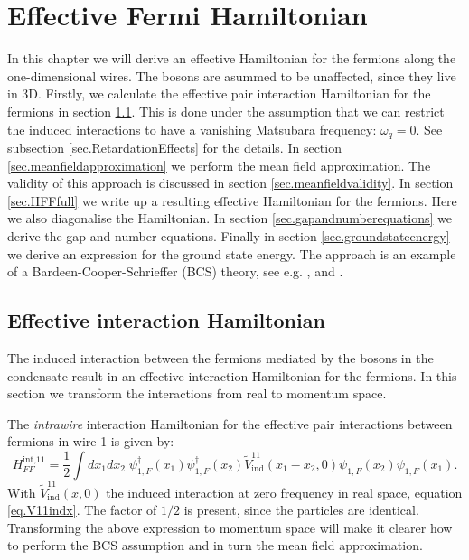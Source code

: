 
\chapter{Effective Fermi Hamiltonian} %

\label{Chapter4} %


In this chapter we will derive an effective Hamiltonian for the fermions along the one-dimensional wires. The bosons are asummed to be unaffected, since they live in 3D. Firstly, we calculate the effective pair interaction Hamiltonian for the fermions in section \ref{sec.HFFint}. This is done under the assumption that we can restrict the induced interactions to have a vanishing Matsubara frequency: $\omega_q = 0$. See subsection \ref{sec.RetardationEffects} for the details. In section \ref{sec.meanfieldapproximation} we perform the mean field approximation. The validity of this approach is discussed in section \ref{sec.meanfieldvalidity}. In section \ref{sec.HFFfull} we write up a resulting effective Hamiltonian for the fermions. Here we also diagonalise the Hamiltonian. In section \ref{sec.gapandnumberequations} we derive the gap and number equations. Finally in section \ref{sec.groundstateenergy} we derive an expression for the ground state energy. The approach is an example of a Bardeen-Cooper-Schrieffer (BCS) theory, see e.g. \cite[pp. 359-369]{PlischkeStatPhys}, \cite[pp. 153-163]{LandauStatPhys2} and \cite[chapter 3]{Tinkham}.   

\section{Effective interaction Hamiltonian} \label{sec.HFFint}
The induced interaction between the fermions mediated by the bosons in the condensate result in an effective interaction Hamiltonian for the fermions. In this section we transform the interactions from real to momentum space. 

The \textit{intrawire} interaction Hamiltonian for the effective pair interactions between fermions in wire 1 is given by:
\begin{equation}
H^\text{int,11}_{FF} = \frac{1}{2}\int dx_1dx_2\; \psi^\dagger_{1,F}(x_1)\psi^\dagger_{1,F}(x_2)\tilde{V}^{11}_{\text{ind}}(x_1 - x_2, 0) \psi_{1,F}(x_2) \psi_{1,F}(x_1).
\label{eq.HFF11intdef}
\end{equation}
With $\tilde{V}^{11}_\text{ind}(x,0)$ the induced interaction at zero frequency in real space, equation \eqref{eq.V11indx}. The factor of $1/2$ is present, since the particles are identical. Transforming the above expression to momentum space will make it clearer how to perform the BCS assumption and in turn the mean field approximation. 

